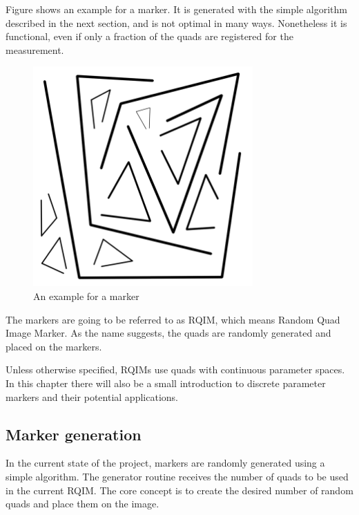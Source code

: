 Figure  shows an example for a marker.
It is generated with the simple algorithm described in the next section, and is not optimal in many ways.
Nonetheless it is functional, even if only a fraction of the quads are registered for the measurement.
\begin{figure}[ht]
	\centering
	\includegraphics[width=0.75\textwidth]{figures/RQIM_1.png}
	\caption{An example for a marker}
	\label{fig:rqimExample}
\end{figure}

The markers are going to be referred to as RQIM, which means Random Quad Image Marker.
As the name suggests, the quads are randomly generated and placed on the markers.

Unless otherwise specified, RQIMs use quads with continuous parameter spaces.
In this chapter there will also be a small introduction to discrete parameter markers and their potential applications.

\subsection{Marker generation}

In the current state of the project, markers are randomly generated using a simple algorithm.
The generator routine receives the number of quads to be used in the current RQIM.
The core concept is to create the desired number of random quads and place them on the image.

